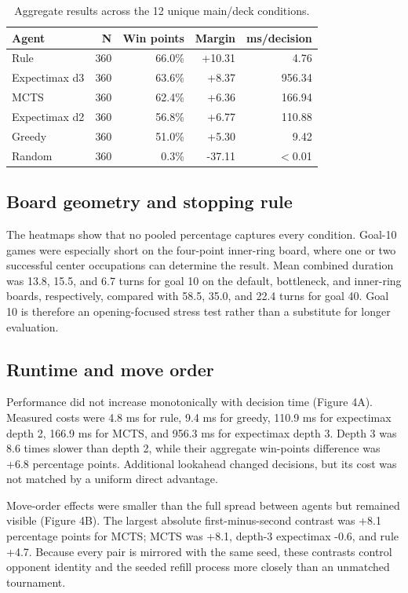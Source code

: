 \documentclass[letterpaper]{article} %
\begin{document}
\begin{table}[t]
\centering
\caption{Aggregate results across the 12 unique main/deck conditions.}
\label{tab:overall}
\small
\begin{tabular}{lrrrr}
\toprule
Agent & N & Win points & Margin & ms/decision \\
\midrule
Rule & 360 & 66.0\% & +10.31 & 4.76 \\
Expectimax d3 & 360 & 63.6\% & +8.37 & 956.34 \\
MCTS & 360 & 62.4\% & +6.36 & 166.94 \\
Expectimax d2 & 360 & 56.8\% & +6.77 & 110.88 \\
Greedy & 360 & 51.0\% & +5.30 & 9.42 \\
Random & 360 & 0.3\% & -37.11 & $<$0.01 \\
\bottomrule
\end{tabular}
\end{table}

\subsection{Board geometry and stopping rule}

The heatmaps show that no pooled percentage captures every condition. Goal-10 games were especially short on the four-point inner-ring board, where one or two successful center occupations can determine the result. Mean combined duration was 13.8, 15.5, and 6.7 turns for goal 10 on the default, bottleneck, and inner-ring boards, respectively, compared with 58.5, 35.0, and 22.4 turns for goal 40. Goal 10 is therefore an opening-focused stress test rather than a substitute for longer evaluation.

\subsection{Runtime and move order}

Performance did not increase monotonically with decision time (Figure 4A). Measured costs were 4.8 ms for rule, 9.4 ms for greedy, 110.9 ms for expectimax depth 2, 166.9 ms for MCTS, and 956.3 ms for expectimax depth 3. Depth 3 was 8.6 times slower than depth 2, while their aggregate win-points difference was +6.8 percentage points. Additional lookahead changed decisions, but its cost was not matched by a uniform direct advantage.

Move-order effects were smaller than the full spread between agents but remained visible (Figure 4B). The largest absolute first-minus-second contrast was +8.1 percentage points for MCTS; MCTS was +8.1, depth-3 expectimax \mbox{-0.6}, and rule +4.7. Because every pair is mirrored with the same seed, these contrasts control opponent identity and the seeded refill process more closely than an unmatched tournament.
\end{document}
